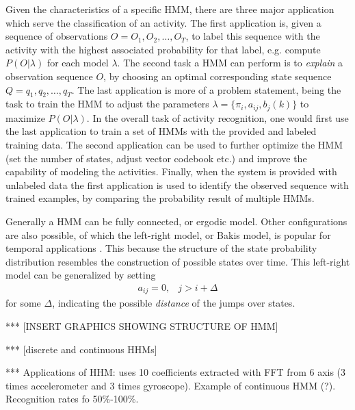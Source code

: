 Given the characteristics of a specific HMM, there are three major application
which serve the classification of an activity. The first application is, given
a sequence of observations $O = O_1,O_2,\dots,O_T$, to label this sequence
with the activity with
the highest associated probability for that label, e.g. compute $P(O|\lambda)$
for each model $\lambda$. The second task a HMM can perform is to
\emph{explain} a observation sequence $O$, by choosing an optimal
corresponding state sequence $Q = q_1,q_2,\dots,q_T$. The last application is
more of a problem statement, being the task to train the HMM to adjust the
parameters $\lambda = \{ \pi_i, a_{ij}, b_j(k)\}$ to maximize $P(O|\lambda)$.
In the overall task of activity recognition, one would first use the last
application to train a set of HMMs with the provided and labeled training
data. The second application can be used to further optimize the HMM (set the
number of states, adjust vector codebook etc.) and improve the capability of
modeling the activities. Finally, when the system is provided with unlabeled
data the first application is used to identify the observed sequence with
trained examples, by comparing the probability result of multiple HMMs.

Generally a HMM can be fully connected, or ergodic model. Other configurations
are also possible, of which the left-right model, or Bakis model, is popular
for temporal applications \cite{rabiner1989tutorial}. This because the
structure of the state probability distribution resembles the construction of
possible states over time. This left-right model can be generalized by setting
\begin{eqnarray}
	a_{ij} = 0, & j > i + \Delta
\end{eqnarray}
for some $\Delta$, indicating the possible \emph{distance} of the jumps over
states.

*** [INSERT GRAPHICS SHOWING STRUCTURE OF HMM]

*** [discrete and continuous HHMs]

*** Applications of HHM: \cite{shi2009towards} uses 10 coefficients extracted
with FFT from 6 axis (3 times accelerometer and 3 times gyroscope). Example of
continuous HMM (?). Recognition rates fo 50\%-100\%.

